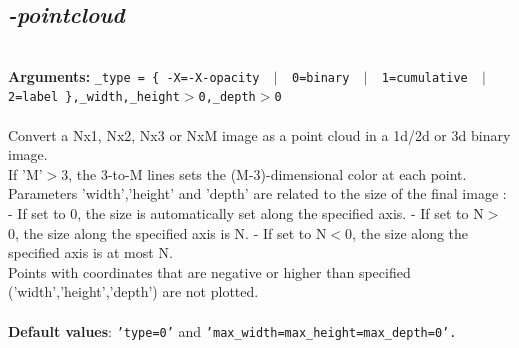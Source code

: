 \documentclass[a4paper,11pt,twoside]{book}
\begin{document}
\subsection{\emph{-pointcloud} }\vspace*{-0.5em}
~\\\textbf{Arguments: } 
{\small \texttt{\_type = \{ -X=-X-opacity ~$|$~ 0=binary ~$|$~ 1=cumulative ~$|$~ 2=label \},\_width,\_height$>$0,\_depth$>$0}}\\~\\
Convert a Nx1, Nx2, Nx3 or NxM image as a point cloud in a 1d/2d or 3d binary image.
~\\If 'M'$>$3, the 3-to-M lines sets the (M-3)-dimensional color at each point.
~\\Parameters 'width','height' and 'depth' are related to the size of the final image :
- If set to 0, the size is automatically set along the specified axis.
- If set to N$>$0, the size along the specified axis is N.
- If set to N$<$0, the size along the specified axis is at most N.
~\\Points with coordinates that are negative or higher than specified ('width','height','depth')
are not plotted.
~\\~\\\textbf{Default values}: {\small \texttt{'type=0'} and \texttt{'max\_width=max\_height=max\_depth=0'.}}
\end{document}
